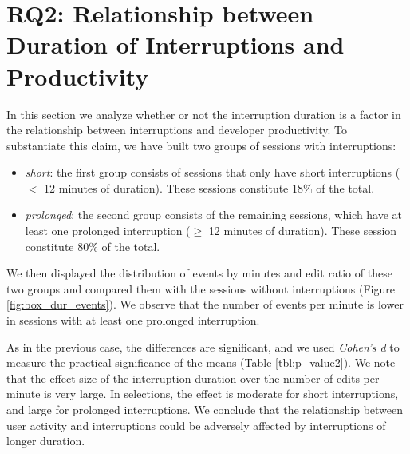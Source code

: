 \documentclass[conference]{IEEEtran}
\begin{document}
\section{RQ2: Relationship between Duration of Interruptions and Productivity}

In this section we analyze whether or not the interruption duration is a factor in the relationship between interruptions and developer productivity. To substantiate this claim, we have built two groups of sessions with interruptions:
\begin{itemize}
\item \textit{short}: the first group consists of sessions that only have short interruptions ($<$ 12 minutes of duration). These sessions constitute 18\% of the total.
\item \textit{prolonged}: the second group consists of the remaining sessions, which have at least one prolonged interruption ($\geq$ 12 minutes of duration). These session constitute 80\% of the total.
\end{itemize} 

We then displayed the distribution of events by minutes and edit ratio of these two groups and compared them with the sessions without interruptions (Figure \ref{fig:box_dur_events}). We observe that the number of events per minute is lower in sessions with at least one prolonged interruption. 

As in the previous case, the differences are significant, and we used \textit{Cohen's d} to measure the practical significance of the means (Table \ref{tbl:p_value2}). We note that the effect size of the interruption duration over the number of edits per minute is very large. In selections, the effect is moderate for short interruptions, and large for prolonged interruptions. We conclude that the relationship between user activity and interruptions could be adversely affected by interruptions of longer duration. 
\end{document}
